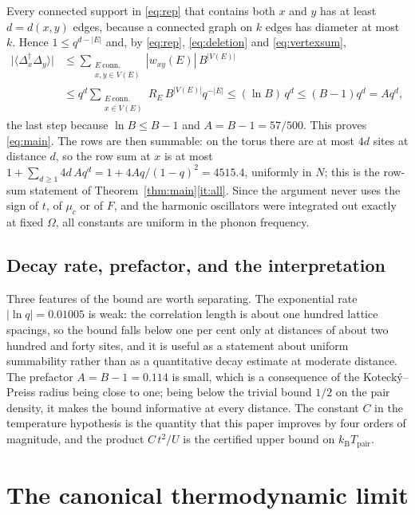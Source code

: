 \documentclass[11pt]{article}
\theoremstyle{plain}
\theoremstyle{definition}
\newcommand{\Dop}{\Delta}
\begin{document}
Every connected support in \eqref{eq:rep} that contains both $x$ and $y$ has at least
$d=d(x,y)$ edges, because a connected graph on $k$ edges has diameter at most $k$.
Hence $1\le q^{d-|E|}$ and, by \eqref{eq:rep}, \eqref{eq:deletion} and
\eqref{eq:vertexsum},
\begin{equation}\label{eq:chain}
\begin{aligned}
\bigl|\langle\Dop_x^\dagger\Dop_y\rangle\bigr|
&\le\sum_{\substack{E\ \text{conn.}\\ x,y\in V(E)}}|w_{xy}(E)|\,B^{|V(E)|}\\
&\le q^{d}\sum_{\substack{E\ \text{conn.}\\ x\in V(E)}}R_E\,B^{|V(E)|}q^{-|E|}
\le(\ln B)\,q^{d}\le(B-1)q^{d}=Aq^{d},
\end{aligned}
\end{equation}
the last step because $\ln B\le B-1$ and $A=B-1=57/500$. This proves
\eqref{eq:main}. The rows are then summable: on the torus there are at most $4d$ sites
at distance $d$, so the row sum at $x$ is at most
$1+\sum_{d\ge1}4d\,Aq^{d}=1+4Aq/(1-q)^{2}=4515.4$, uniformly in $N$; this is the
row-sum statement of Theorem~\ref{thm:main}\ref{it:all}. Since the argument
never uses the sign of $t$, of $\mu_c$ or of $F$, and the harmonic oscillators were
integrated out exactly at fixed $\Omega$, all constants are uniform in the
phonon frequency.

\subsection{Decay rate, prefactor, and the interpretation}\label{sec:decay}

Three features of the bound are worth separating. The exponential rate
$|\ln q|=0.01005$ is weak: the correlation length is about one hundred lattice
spacings, so the bound falls below one per cent only at distances of about two
hundred and forty sites, and it is useful as a statement about uniform summability
rather than as a quantitative decay estimate at moderate distance. The prefactor
$A=B-1=0.114$ is small, which is a consequence of the Koteck\'y--Preiss radius being
close to one; being below the trivial bound $1/2$ on the pair density, it makes the
bound informative at every distance. The constant $C$ in the temperature hypothesis
is the quantity that this paper improves by four orders of magnitude, and the product
$C\,t^{2}/U$ is the certified upper bound on $k_{\mathrm{B}}T_{\mathrm{pair}}$.

\section{The canonical thermodynamic limit}\label{sec:canonical}
\end{document}
